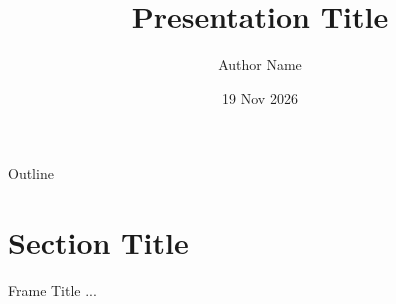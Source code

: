 \documentclass[10pt]{beamer}
\title{Presentation Title}
\author{Author Name}
\institute{University Name}
\date{19 Nov 2026}
\begin{document}
\begin{frame}
\titlepage
\end{frame}

\begin{frame}{Outline}
  \tableofcontents
\end{frame}


\section{Section Title}
\begin{frame}{Frame Title}
...
\end{frame}
\end{document}
